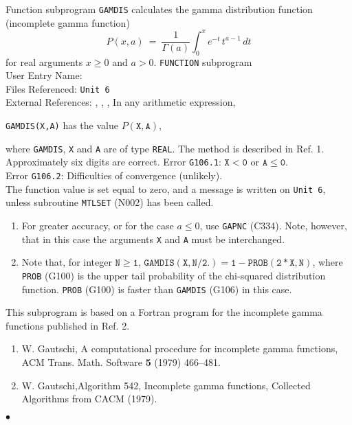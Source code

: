                
            
\Submitter{}               
            
Function subprogram {\tt GAMDIS} calculates the gamma distribution
function (incomplete gamma function)
$$P(x,a) \ = \ \frac{1}{\Gamma(a)} \int_0^x e^{-t}\,t^{a-1}\,dt$$
for real arguments $x \geq 0$ and $a > 0$.
\Structure
{\tt FUNCTION} subprogram \\
User Entry Name:  \\
Files Referenced: {\tt Unit 6} \\
External References: , ,
, 
\Usage
In any arithmetic expression,
\begin{center}
{\tt GAMDIS(X,A)} \quad has the value \quad $P(\mathtt{X,A})$,
\end{center}
where {\tt GAMDIS}, {\tt X} and {\tt A} are of type {\tt REAL}.
\Method
The method is described in Ref. 1.
\Accuracy
Approximately six digits are correct.
\Errorh
Error {\tt G106.1}: $\mathtt{X<0}$ or $\mathtt{A \le 0}$. \\
Error {\tt G106.2}: Difficulties of convergence (unlikely). \\
The function value is set equal to zero, and a message is written on
{\tt Unit 6}, unless subroutine {\tt MTLSET} (N002) has been called.
\Notes
\begin{enumerate}
\item For greater accuracy, or for the case $a \le 0$,
use {\tt GAPNC} (C334).
Note, however, that in this case the arguments {\tt X}
and {\tt A} must be interchanged.
\item Note that, for integer $\mathtt{N \geq 1}$,
$\mathtt{GAMDIS(X,N/2.) = 1-PROB(2*X,N)}$,
where {\tt PROB} (G100) is the upper tail probability of the chi-squared
distribution function. {\tt PROB} (G100) is faster
than {\tt GAMDIS} (G106) in   this case.
\end{enumerate}
\Source
This subprogram is based on a Fortran program for the incomplete gamma
functions published in Ref. 2.
\Refer
\begin{enumerate}
\item W. Gautschi, A computational procedure for incomplete gamma
functions, ACM Trans. Math. Software {\bf 5} (1979) 466--481.
\item W. Gautschi,Algorithm 542, Incomplete gamma functions,
Collected Algorithms from CACM (1979).
\end{enumerate}
$\bullet$

